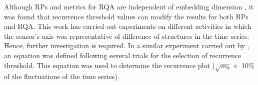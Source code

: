 Although RPs and metrics for RQA are independent of embedding dimension \cite{iwanski1998},
it was found that recurrence threshold values can modify the results for both RPs and RQA.
This work has carried out experiments on different activities in which 
the sensor's axis was representative of difference of structures in the time series.
Hence, further investigation is required.
In a similar experiment carried out by \cite{letellier2006}, an equation was defined following 
several trials for the selection of recurrence threshold. 
This equation was used to determine the recurrence plot 
($\sqrt{m_0} \times$ 10\% of the fluctuations of the time series).




